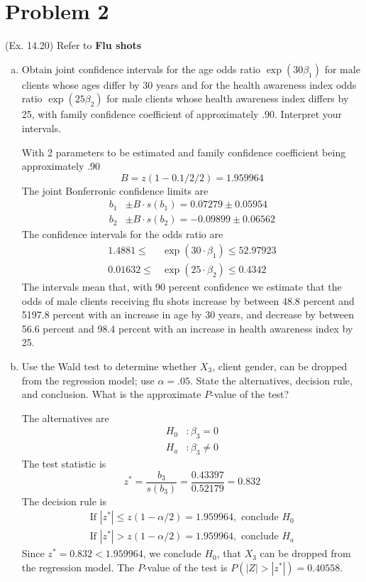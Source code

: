 \documentclass[10pt]{report}
\newcommand{\abs}[1] {\left| #1 \right|}
\begin{document}
\section*{Problem 2}
(Ex. 14.20) Refer to \textbf{Flu shots}
\begin{enumerate}[a.]
	\item 
	Obtain joint confidence intervals for the age odds ratio $\exp(30\beta_1)$ for male clients whose ages differ by 30 years and for the health awareness index odds ratio $\exp(25\beta_2)$ for male clients whose health awareness index differs by 25, with family confidence coefficient of approximately .90. Interpret your intervals.
	
	With 2 parameters to be estimated and family confidence coefficient being approximately .90
	\[
	B = z(1 - 0.1/2/2) = 1.959964
	\]
	The joint Bonferronic confidence limits are
	\begin{align*}
		b_1 &\pm B\cdot s(b_1) = 0.07279 \pm 0.05954\\
		b_2 &\pm B\cdot s(b_2) = -0.09899 \pm 0.06562
	\end{align*}
	The confidence intervals for the odds ratio are
	\begin{align*}
		1.4881 \le &\exp(30\cdot \beta_1) \le 52.97923\\
		0.01632 \le &\exp(25\cdot \beta_2) \le 0.4342
	\end{align*}
	The intervals mean that, with 90 percent confidence we estimate that the odds of male clients receiving flu shots increase by between 48.8 percent and 5197.8 percent with an increase in age by 30 years, and decrease by between 56.6 percent and 98.4 percent with an increase in health awareness index by 25.
	
	\item 
	Use the Wald test to determine whether $X_3$, client gender, can be dropped from the regression model; use $\alpha=.05$. State the alternatives, decision rule, and conclusion. What is the approximate $P$-value of the test?
	
	The alternatives are
	\begin{align*}
		H_0 &: \beta_3 = 0\\
		H_a &: \beta_3 \ne 0
	\end{align*}
	The test statistic is
	\[
	z^* = \frac{b_3}{s(b_3)} = \frac{0.43397}{0.52179} = 0.832
	\]
	The decision rule is
	\begin{align*}
	\text{If } \abs{z^*} \le z(1-\alpha/2) = 1.959964, \text{ conclude } H_0\\
	\text{If } \abs{z^*} > z(1-\alpha/2) = 1.959964, \text{ conclude } H_a
	\end{align*}
	Since $z^* = 0.832 < 1.959964$, we conclude $H_0$, that $X_3$ can be dropped from the regression model. The $P$-value of the test is $P(\abs{Z} > \abs{z^*}) = 0.40558$.
	

\end{enumerate}
\end{document}
